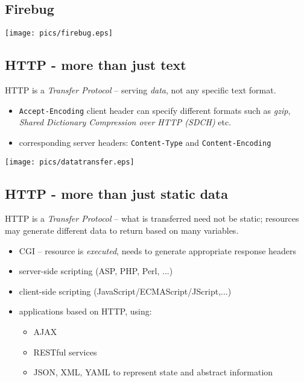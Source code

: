\documentclass[xga]{xdvislides}
\begin{document}
\subsection{Firebug}
\begin{center}
	\texttt{[image: pics/firebug.eps]}
\end{center}



\subsection{HTTP - more than just text}
HTTP is a {\em Transfer Protocol} -- serving {\em data}, not any specific
text format.

\begin{itemize}
	\item {\tt Accept-Encoding} client header can specify different formats
		such as {\em gzip}, {\em Shared Dictionary Compression over HTTP (SDCH)} etc.
	\item corresponding server headers: {\tt Content-Type} and
		{\tt Content-Encoding}
\end{itemize}
\begin{center}
	\texttt{[image: pics/datatransfer.eps]}
\end{center}

\subsection{HTTP - more than just static data}
HTTP is a {\em Transfer Protocol} -- what is transferred need not be
static; resources may generate different data to return based on many
variables.

\begin{itemize}
	\item CGI -- resource is {\em executed}, needs to generate
		appropriate response headers
	\item server-side scripting (ASP, PHP, Perl, ...)
	\item client-side scripting (JavaScript/ECMAScript/JScript,...)
	\item applications based on HTTP, using:
		\begin{itemize}
			\item AJAX
			\item RESTful services
			\item JSON, XML, YAML to represent state and
				abstract information
		\end{itemize}
\end{itemize}
\end{document}
